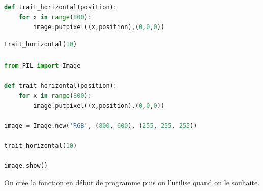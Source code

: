 \documentclass[svgnames,11pt]{beamer}
\begin{document}
\begin{frame}[fragile]
    \frametitle{}

\begin{center}
\begin{lstlisting}[language=Python , basicstyle=\ttfamily\small, xleftmargin=2em, xrightmargin=2em]
def trait_horizontal(position):
    for x in range(800):
        image.putpixel((x,position),(0,0,0))
\end{lstlisting}
\label{CODE}
\end{center}

\begin{center}
\begin{lstlisting}[language=Python , basicstyle=\ttfamily\small, xleftmargin=2em, xrightmargin=2em]
trait_horizontal(10)
\end{lstlisting}
\label{CODE}
\end{center}

\end{frame}
\begin{frame}[fragile]
    \frametitle{}

\begin{center}
\begin{lstlisting}[language=Python , basicstyle=\ttfamily\small, xleftmargin=0.em, xrightmargin=0.em]
from PIL import Image

def trait_horizontal(position):
    for x in range(800):
        image.putpixel((x,position),(0,0,0))

image = Image.new('RGB', (800, 600), (255, 255, 255))

trait_horizontal(10)

image.show()
\end{lstlisting}
\label{img}
\end{center} 
\begin{aretenir}[]
    On crée la fonction en début de programme puis on l'utilise quand on le souhaite.
    \end{aretenir}
\end{frame}
\end{document}
